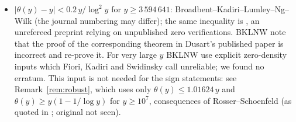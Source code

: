 \begin{itemize}
\item[(F6)] $|\theta(y)-y|<0.2\,y/\log^2y$ for $y\ge3\,594\,641$: Broadbent--Kadiri--Lumley--Ng--Wilk \cite[arXiv:2002.11068v2, Corollary~11.2, eq.~(3.39), row $M_2=0.2$]{BKLNW} (the journal numbering may differ); the same inequality is \cite[Theorem~5.2]{Dusart}, an unrefereed preprint relying on unpublished zero verifications. BKLNW note that the proof of the corresponding theorem in Dusart's published paper is incorrect and re-prove it. For very large $y$ BKLNW use explicit zero-density inputs which Fiori, Kadiri and Swidinsky \cite{FKS} call unreliable; we found no erratum. This input is not needed for the sign statements: see Remark~\ref{rem:robust}, which uses only $\theta(y)\le1.01624\,y$ and $\theta(y)\ge y(1-1/\log y)$ for $y\ge10^7$, consequences of Rosser--Schoenfeld \cite{RS62} (as quoted in \cite[Tables~1--2]{BKLNW}; original not seen).
\end{itemize}


